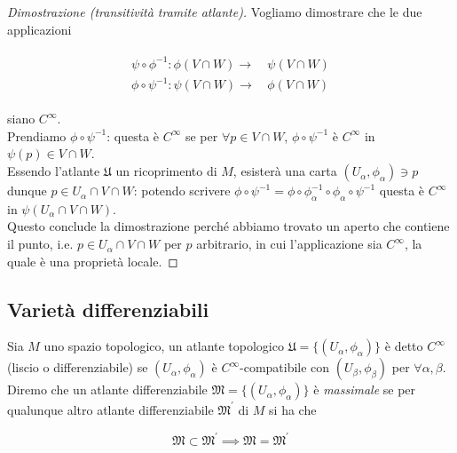\begin{proof}[Dimostrazione (transitività tramite atlante)]
	Vogliamo dimostrare che le due applicazioni
	
	\begin{align}
		\begin{split}
			\psi \circ \phi^{-1} : \phi(V \cap W) \to& \, \psi(V \cap W)\\
			\phi \circ \psi^{-1} : \psi(V \cap W) \to& \, \phi(V \cap W)
		\end{split}
	\end{align}

	siano $ C^{\infty} $.\\
	Prendiamo $ \phi \circ \psi^{-1} $: questa è $ C^{\infty} $ se per $ \forall p \in V \cap W $, $ \phi \circ \psi^{-1} $ è $ C^{\infty} $ in $ \psi(p) \in V \cap W $.\\
	Essendo l'atlante $ \mathfrak{U} $ un ricoprimento di $ M $, esisterà una carta $ (U_{\alpha},\phi_{\alpha}) \ni p $ dunque $ p \in U_{\alpha} \cap V \cap W $: potendo scrivere $ \phi \circ \psi^{-1} = \phi \circ \phi_{\alpha}^{-1} \circ \phi_{\alpha} \circ \psi^{-1} $ questa è $ C^{\infty} $ in $ \psi(U_{\alpha} \cap V \cap W) $.\\
	Questo conclude la dimostrazione perché abbiamo trovato un aperto che contiene il punto, i.e. $ p \in U_{\alpha} \cap V \cap W $ per $ p $ arbitrario, in cui l'applicazione sia $ C^{\infty} $, la quale è una proprietà locale.
	
\end{proof}

\subsection{Varietà differenziabili}

Sia $ M $ uno spazio topologico, un atlante topologico $ \mathfrak{U} = \{(U_{\alpha},\phi_{\alpha})\} $ è detto $ C^{\infty} $ (liscio o differenziabile) se $ (U_{\alpha},\phi_{\alpha}) $ è $ C^{\infty} $-compatibile con $ (U_{\beta},\phi_{\beta}) $ per $ \forall \alpha,\beta $.\\
Diremo che un atlante differenziabile $ \mathfrak{M} = \{(U_{\alpha},\phi_{\alpha})\} $ è \textit{massimale} se per qualunque altro atlante differenziabile $ \mathfrak{M}^{\prime} $ di $ M $ si ha che

\begin{equation}
	\mathfrak{M} \subset \mathfrak{M}^{\prime} \implies \mathfrak{M} = \mathfrak{M}^{\prime}
\end{equation}

